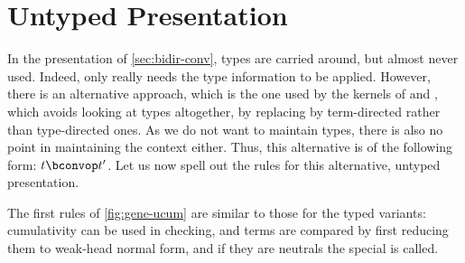 \section{Untyped Presentation}
\label{sec:unty-conv-equiv}

In the presentation of \cref{sec:bidir-conv}, types are carried around,
but almost never used. Indeed,
only  really needs the type information to be applied.
However, there is an alternative approach, which is the one used by the kernels of 
and , which avoids looking at types altogether, by replacing 
by term-directed rather than type-directed ones.
As we do not want to maintain types, there is also no point in maintaining the context either.
Thus, this alternative  is of the following form: $\buconv{\gamma}{t}{t'}$.
Let us now spell out the rules for this alternative, untyped presentation.

\begin{figure*}[h]
  \ContinuedFloat*
  \caption{Untyped cumulativity and conversion}
  \label{fig:gene-ucum}
\end{figure*}

The first rules of \cref{fig:gene-ucum} are similar to those for the typed variants: cumulativity can be used
in checking, and terms are compared by first reducing them to weak-head normal form, and if they are neutrals
the special  is called.

